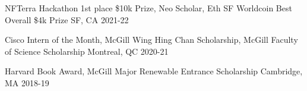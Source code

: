 



\begin{cvhonors}


  \cvhonor
  {NFTerra Hackathon 1st place \$10k Prize, Neo Scholar, Eth SF Worldcoin Best Overall \$4k Prize} %
  {} %
  {SF, CA} %
  {2021-22} %

  
  \cvhonor
  {Cisco Intern of the Month, McGill Wing Hing Chan Scholarship, McGill Faculty of Science Scholarship} %
  {} %
  {Montreal, QC} %
  {2020-21} %
  

    \cvhonor
    {Harvard Book Award, McGill Major Renewable Entrance Scholarship} %
    {} %
    {Cambridge, MA} %
    {2018-19} %


% 

\end{cvhonors}


